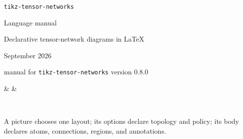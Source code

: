 \documentclass[11pt]{article}
\newcommand\pkg{\texttt{tikz-tensor-networks}}
\begin{document}
\thispagestyle{empty}
\begin{fullwidth}
  \centering
  \vspace*{16mm}
  {\Huge \pkg\par}
  \vspace{3mm}
  {\Large Language manual\par}
  \vspace{3mm}
  {\Large Declarative tensor-network diagrams in \LaTeX\par}
  \vspace{4mm}
  {September 2026\par}
  \vspace{1mm}
  {\small manual for \pkg{} version 0.8.0\par}
  \vspace{16mm}

  \begin{tenkz}[cols=3]
     &
     &
  \end{tenkz}
  \hspace{13mm}
  \begin{tenkz}[rows={ket,bra}, cols=1, west=open, east={cup=$X$}]
     \\
  \end{tenkz}

  \vspace{16mm}
  \begin{minipage}{0.78\mfullwidth}
    \large
    A picture chooses one layout; its options declare topology and
    policy; its body declares atoms, connections, regions, and
    annotations.
  \end{minipage}
\end{fullwidth}

\clearpage
\setcounter{tocdepth}{1}
\tableofcontents











\end{document}
